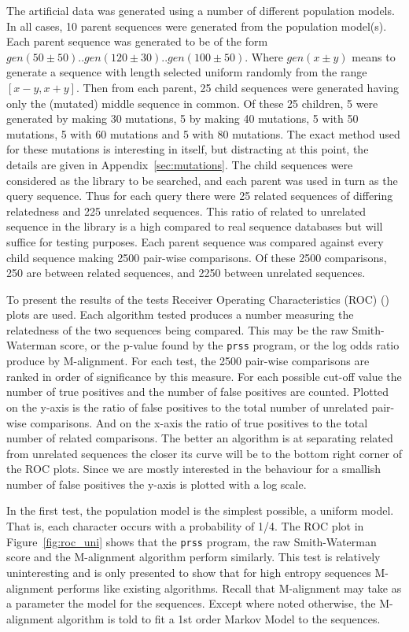 \documentclass[a4paper,11pt,oneside]{article}
\begin{document}
The artificial data was generated using a number of different population
models.  In all cases, 10 parent sequences were generated from the population
model(s).  Each parent sequence was generated to be of the form $gen(50\pm50)
.. gen(120\pm30) .. gen(100\pm50)$.  Where $gen(x\pm y)$ means to generate a
sequence with length selected uniform randomly from the range $[x-y, x+y]$.
Then from each parent, 25 child sequences were generated having only the
(mutated) middle sequence in common.  Of these 25 children, 5 were generated
by making 30 mutations, 5 by making 40 mutations, 5 with 50 mutations, 5 with
60 mutations and 5 with 80 mutations.  The exact method used for these
mutations is interesting in itself, but distracting at this point, the details
are given in Appendix~\ref{sec:mutations}.  The child sequences were
considered as the library to be searched, and each parent was used in turn as
the query sequence.  Thus for each query there were 25 related sequences of
differing relatedness and 225 unrelated sequences.  This ratio of related to
unrelated sequence in the library is a high compared to real sequence
databases but will suffice for testing purposes.  Each parent sequence was
compared against every child sequence making 2500 pair-wise comparisons.  Of
these 2500 comparisons, 250 are between related sequences, and 2250 between
unrelated sequences.

To present the results of the tests Receiver Operating Characteristics (ROC)
(\cite{gribskov96, brenner98}) plots are used.  Each algorithm tested produces
a number measuring the relatedness of the two sequences being compared.  This
may be the raw Smith-Waterman score, or the p-value found by the \verb!prss! 
program, or the log odds ratio produce by M-alignment.  For each test, the
2500 pair-wise comparisons are ranked in order of significance by this
measure.  For each possible cut-off value the number of true positives and the
number of false positives are counted.  Plotted on the y-axis is the ratio of
false positives to the total number of unrelated pair-wise comparisons.  And
on the x-axis the ratio of true positives to the total number of related
comparisons.  The better an algorithm is at separating related from unrelated
sequences the closer its curve will be to the bottom right corner of the ROC
plots.  Since we are mostly interested in the behaviour for a smallish number
of false positives the y-axis is plotted with a log scale.

In the first test, the population model is the simplest possible, a uniform
model.  That is, each character occurs with a probability of 1/4.  The ROC
plot in Figure~\ref{fig:roc_uni} shows that the \verb!prss! program, the raw
Smith-Waterman score and the M-alignment algorithm perform similarly.  This
test is relatively uninteresting and is only presented to show that for high
entropy sequences M-alignment performs like existing algorithms.  Recall that
M-alignment may take as a parameter the model for the sequences.  Except where
noted otherwise, the M-alignment algorithm is told to fit a 1st order Markov
Model to the sequences.
\end{document}
